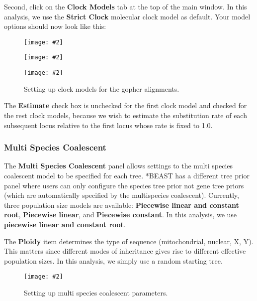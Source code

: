 \documentclass{article}
\newcommand{\includeimage}[2][]{%
\texttt{[image: \#2]}
}
\begin{document}
Second, click on the {\bf Clock Models} tab at the top of the
main window. In this analysis, we use the \textbf{Strict Clock} molecular clock model as default.
Your model options should now look like this: 

\begin{figure}
\centering
\includeimage[scale=0.3,clip=true,trim=0 450 0 0]{figures/BEAUti_ClockModel1}

\centering
\includeimage[scale=0.3,clip=true,trim=0 450 0 0]{figures/BEAUti_ClockModel2}

\centering
\includeimage[scale=0.3,clip=true,trim=0 450 0 0]{figures/BEAUti_ClockModel3}

\caption{\label{fig.clockmodel} Setting up clock models for the gopher alignments.}
\end{figure}


The \textbf{Estimate} check box is unchecked for the first clock model and checked for the rest clock models, because we wish to estimate the substitution rate of each subsequent locus relative to the first locus whose rate is fixed to 1.0. 

\subsubsection*{Multi Species Coalescent}

The {\bf Multi Species Coalescent} panel allows settings to the multi species coalescent model to be specified for each tree. *BEAST has a different tree prior panel where users can only configure the species tree prior not gene tree priors (which are automatically specified by the multispecies coalescent). 
Currently, three population size models are available: \textbf{Piecewise linear and constant root}, \textbf{Piecewise linear}, and \textbf{Piecewise constant}. In this analysis, we use \textbf{piecewise linear and constant root}.

The \textbf{Ploidy} item determines the type of sequence (mitochondrial, nuclear, X, Y). This matters since different modes of inheritance gives rise to different effective population sizes. In this analysis, we simply use a random starting tree. 

\begin{figure}
\centering
\includeimage[scale=0.3,clip=true,trim=0 150 0 0]{figures/BEAUti_MSP}

\caption{\label{fig.MSP} Setting up multi species coalescent parameters.}
\end{figure}
\end{document}
